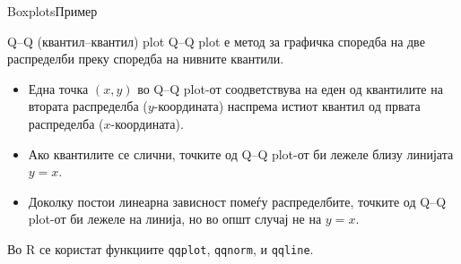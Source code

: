 \documentclass[hyperref={unicode}, xcolor={svgnames, table},
usepdftitle=false]{beamer}
\theoremstyle{remark}
\begin{document}
\begin{frame}[fragile]{Boxplots}{Пример}
\begin{figure}
\begin{subfigure}[b]{.45\linewidth}
    \end{subfigure}
  \end{figure}
\end{frame}

\begin{frame}{Q--Q (квантил--квантил) plot}
  Q--Q plot е метод за графичка споредба на две распределби преку споредба на
  нивните квантили.
  \begin{itemize}
  \item Една точка \((x, y)\) во Q--Q plot-от соодветствува на еден од
    квантилите на втората распределба (\(y\)-координата) наспрема истиот квантил
    од првата распределба (\(x\)-координата).
  \item Ако квантилите се слични, точките од Q--Q plot-от би лежеле близу
    линијата \(y = x\).
  \item Доколку постои линеарна зависност помеѓу распределбите, точките од Q--Q
    plot-от би лежеле на линија, но во општ случај не на \(y = x\).
  \end{itemize}

  Во R се користат функциите \texttt{qqplot}, \texttt{qqnorm}, и
  \texttt{qqline}.
\end{frame}
\end{document}
